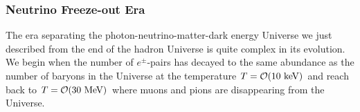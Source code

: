 \subsubsection{Neutrino Freeze-out Era }\label{nudecoup}
The era separating the photon-neutrino-matter-dark energy Universe we just described from the end of the hadron Universe is quite complex in its evolution. We begin when the number of $e^\pm$-pairs has decayed to the same abundance as the number of baryons in the Universe at the temperature $T=\mathcal{O}(10\text{ keV})$ and reach back to $T={\cal O}(30\MeV)$ where muons and pions are disappearing from the Universe.

\begin{figure}
\begin{minipage}{\linewidth}

\end{minipage}
\end{figure}
